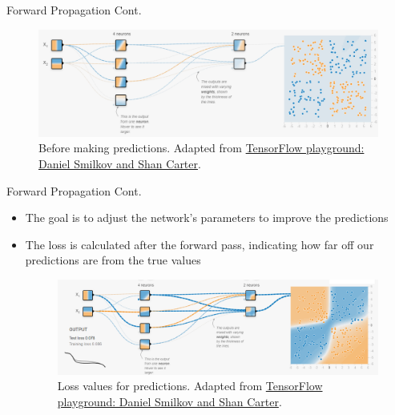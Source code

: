 \documentclass[serif, aspectratio=169]{beamer}
\begin{document}
\begin{frame}{Forward Propagation Cont.}
	\begin{figure}[h]
		\includegraphics[width=\linewidth]{pic/4/tensorflow0.png}\\
		{\scriptsize Before making predictions. Adapted from \href{playground.tensorflow.org}{TensorFlow playground: Daniel Smilkov and Shan Carter}.}
	\end{figure}
\end{frame}

\begin{frame}[t]{Forward Propagation Cont.}
	\begin{itemize}
		\item The goal is to adjust the network’s parameters to improve the predictions
		\item The loss is calculated after the forward pass, indicating how far off our predictions are from the true values
		      \begin{figure}[bh]
		      	\centering
		      	\includegraphics[width=\linewidth]{pic/4/tensorflow2.png} \\
		      	{\scriptsize Loss values for predictions. Adapted from \href{playground.tensorflow.org}{TensorFlow playground: Daniel Smilkov and Shan Carter}.}
		      \end{figure}
	\end{itemize}
\end{frame}
\end{document}
